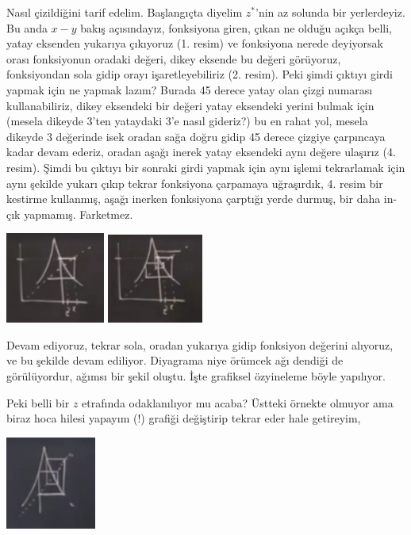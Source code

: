 \documentclass[12pt,fleqn]{article}\usepackage{../../common}
\begin{document}
Nasıl çizildiğini tarif edelim. Başlangıçta diyelim $z^*$'nin az solunda
bir yerlerdeyiz. Bu anda $x-y$ bakış açısındayız, fonksiyona giren, çıkan
ne olduğu açıkça belli, yatay eksenden yukarıya çıkıyoruz (1. resim) ve
fonksiyona nerede deyiyorsak orası fonksiyonun oradaki değeri, dikey
eksende bu değeri görüyoruz, fonksiyondan sola gidip orayı
işaretleyebiliriz (2. resim). Peki şimdi çıktıyı girdi yapmak için ne
yapmak lazım? Burada 45 derece yatay olan çizgi numarası kullanabiliriz,
dikey eksendeki bir değeri yatay eksendeki yerini bulmak için (mesela
dikeyde 3'ten yataydaki 3'e nasıl gideriz?) bu en rahat yol, mesela dikeyde
3 değerinde isek oradan sağa doğru gidip 45 derece çizgiye çarpıncaya kadar
devam ederiz, oradan aşağı inerek yatay eksendeki aynı değere ulaşırız
(4. resim). Şimdi bu çıktıyı bir sonraki girdi yapmak için aynı işlemi
tekrarlamak için aynı şekilde yukarı çıkıp tekrar fonksiyona çarpamaya
uğraşırdık, 4. resim bir kestirme kullanmış, aşağı inerken fonksiyona
çarptığı yerde durmuş, bir daha in-çık yapmamış. Farketmez.

\includegraphics[width=8.8em]{18_16.png}
\includegraphics[width=8.5em]{18_18.png}

Devam ediyoruz, tekrar sola, oradan yukarıya gidip fonksiyon değerini
alıyoruz, ve bu şekilde devam ediliyor. Diyagrama niye örümcek ağı dendiği
de görülüyordur, ağımsı bir şekil oluştu. İşte grafiksel özyineleme böyle
yapılıyor.

Peki belli bir $z$ etrafında odaklanılıyor mu acaba? Üstteki örnekte
olmuyor ama biraz hoca hilesi yapayım (!) grafiği değiştirip tekrar eder
hale getireyim, 

\includegraphics[width=8em]{18_13.png}
\end{document}
